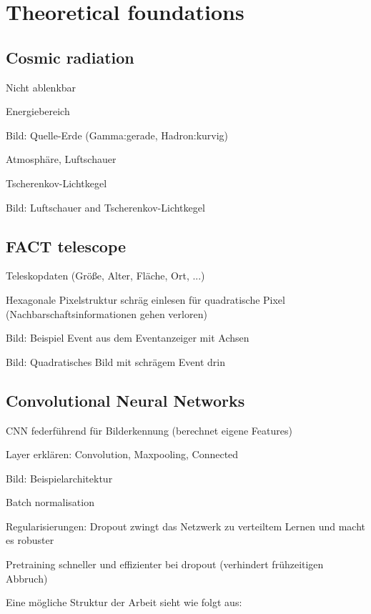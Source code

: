 \chapter{Theoretical foundations}

\section{Cosmic radiation}
Nicht ablenkbar

Energiebereich

Bild: Quelle-Erde (Gamma:gerade, Hadron:kurvig)

Atmosphäre, Luftschauer

Tscherenkov-Lichtkegel

Bild: Luftschauer and Tscherenkov-Lichtkegel



\section{FACT telescope}
Teleskopdaten (Größe, Alter, Fläche, Ort, ...)

Hexagonale Pixelstruktur schräg einlesen für quadratische Pixel (Nachbarschaftsinformationen gehen verloren)

Bild: Beispiel Event aus dem Eventanzeiger mit Achsen

Bild: Quadratisches Bild mit schrägem Event drin



\section{Convolutional Neural Networks}
CNN federführend für Bilderkennung (berechnet eigene Features)

Layer erklären: Convolution, Maxpooling, Connected

Bild: Beispielarchitektur

Batch normalisation

Regularisierungen: Dropout zwingt das Netzwerk zu verteiltem Lernen und macht es robuster

Pretraining schneller und effizienter bei dropout (verhindert frühzeitigen Abbruch)





Eine mögliche Struktur der Arbeit sieht wie folgt aus:

